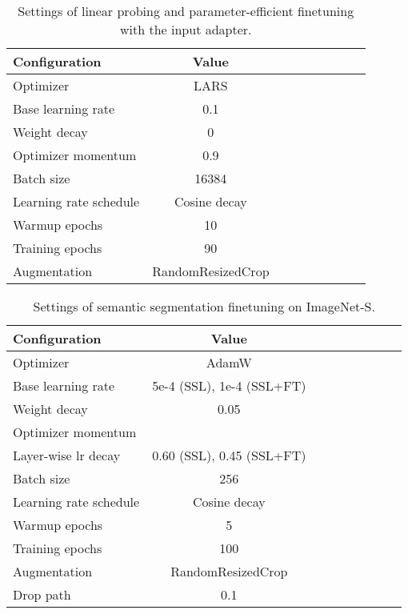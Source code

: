 \documentclass{article} \usepackage{iclr2023_conference,times}
\begin{document}
\begin{table}[]
	\centering
	\setlength{\tabcolsep}{8mm}
\caption{Settings of linear probing and parameter-efficient finetuning with the input adapter.
	}
	\small
	\begin{tabular}{lcccccccc}
		\toprule
        Configuration      & Value \\	\midrule
        Optimizer & LARS \\
        Base learning rate & 0.1 \\
        Weight decay & 0 \\
        Optimizer momentum & 0.9 \\
        Batch size & 16384 \\
        Learning rate schedule & Cosine decay \\
        Warmup epochs & 10 \\
        Training epochs & 90 \\
        Augmentation & RandomResizedCrop \\
		\bottomrule
	\end{tabular}
	\label{tab:liner_prob}
\end{table}

\begin{table}[]
	\centering
	\setlength{\tabcolsep}{8mm}
	\caption{Settings of semantic segmentation finetuning on ImageNet-S.
	}
	\small
	\begin{tabular}{lcccccccc}
		\toprule
        Configuration      & Value \\	\midrule
        Optimizer & AdamW \\
        Base learning rate & 5e-4 (SSL), 1e-4 (SSL+FT) \\
        Weight decay & 0.05 \\
        Optimizer momentum &  \\
        Layer-wise lr decay  & 0.60 (SSL), 0.45 (SSL+FT)  \\
        Batch size & 256 \\
        Learning rate schedule & Cosine decay \\
        Warmup epochs & 5 \\
        Training epochs & 100  \\
        Augmentation & RandomResizedCrop \\
        Drop path  & 0.1 \\
		\bottomrule
	\end{tabular}
	\label{tab:imagenet-seg}
\end{table}
\end{document}
